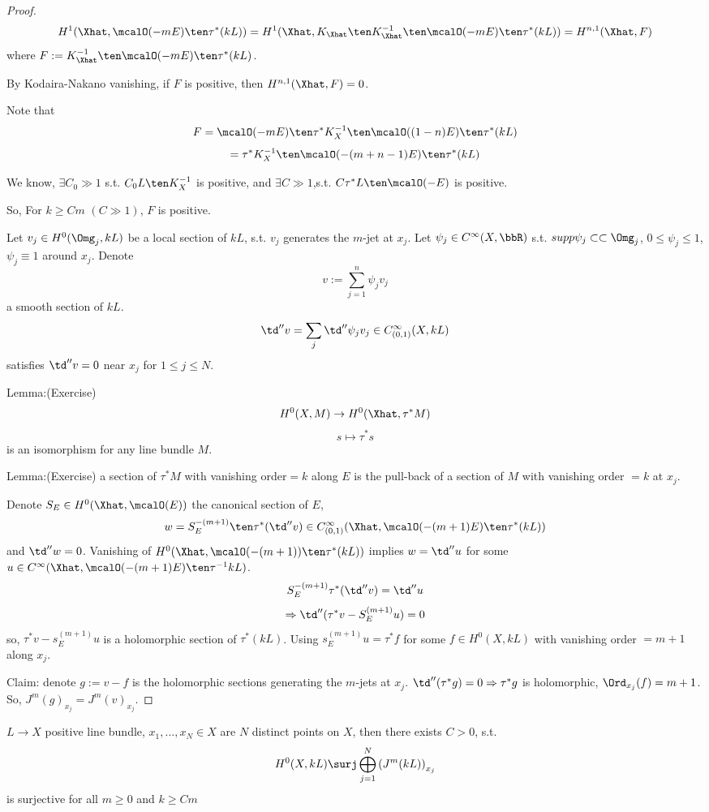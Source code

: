 \begin{proof}
$$
  H^1(\Xhat,\mcalO(-mE)\ten\tau^*(kL))
=
  H^1(\Xhat,K_{\Xhat}\ten K^{-1}_{\Xhat}\ten\mcalO(-mE)\ten\tau^*(kL))
=
  H^{n,1}(\Xhat,F)
$$
where $F:= K^{-1}_{\Xhat}\ten\mcalO(-mE)\ten\tau^*(kL)$.

By Kodaira-Nakano vanishing, if $F$ is positive,
then $H^{n,1}(\Xhat,F)=0$.

Note that 
$$F=\mcalO(-mE)\ten\tau^*K_X^{-1}\ten\mcalO((1-n)E)\ten\tau^*(kL)$$
$$=\tau^*K_X^{-1}\ten\mcalO(-(m+n-1)E)\ten\tau^*(kL)$$

We know, $\exists C_0\gg 1$ s.t. $C_0L\ten K_X^{-1}$ is positive,
and $\exists C\gg 1$,s.t. $C\tau^*L\ten\mcalO(-E)$ is positive.

So, For $k\geq Cm\,\,(C\gg 1)$, $F$ is positive.

Let $v_j\in H^0(\Omg_j,kL)$ be a local section of $kL$,
s.t. $v_j$ generates the $m$-jet at $x_j$. Let
$\psi_j\in C^\infty(X,\bbR)$ s.t. $supp\psi_j\subset\subset\Omg_j$,
$0\leq\psi_j\leq 1$, $\psi_j\equiv 1$ around $x_j$. Denote
$$
  v:=\sum_{j=1}^{n}
    \psi_jv_j
$$
a smooth section of $kL$.
$$
  \td''v=\sum_{j}\td''\psi_jv_j\in C_{(0,1)}^{\infty}(X,kL)
$$
satisfies $\td''v=0$ near $x_j$ for $1\leq j\leq N$.

Lemma:(Exercise)
$$H^0(X,M)\to H^0(\Xhat,\tau^*M)$$
$$s\mapsto\tau^*s$$
is an isomorphism for any line bundle $M$.

Lemma:(Exercise)
a section of $\tau^*M$ with vanishing order$=k$ along $E$ is the
pull-back of a section of $M$ with vanishing order $=k$ at $x_j$.
\vs 

Denote $S_E\in H^0(\Xhat,\mcalO(E))$ the canonical section of $E$,
$$
  w=S_E^{-(m+1)}\ten\tau^*(\td''v)\in
  C_{(0,1)}^{\infty}
  (\Xhat,\mcalO(-(m+1)E)\ten\tau^*(kL))
$$
and $\td''w=0$. Vanishing of $H^0(\Xhat,\mcalO(-(m+1))\ten\tau^*(kL))$
implies $w=\td'' u$ for some $u\in C^\infty(\Xhat,\mcalO(-(m+1)E)\ten\tau^{-1}kL)$.
$$S_E^{-(m+1)}\tau^*(\td''v)=\td''u$$
$$\Rightarrow\td''(\tau^*v-S_E^{(m+1)}u)=0$$
so, $\tau^*v-s_E^{(m+1)}u$ is a holomorphic section of $\tau^*(kL)$.
Using $s_E^{(m+1)}u=\tau^*f$ for some $f\in H^0(X,kL)$ with vanishing order
$= m+1$ along $x_j$.

Claim: denote $g:= v-f$ is the holomorphic sections generating 
the $m$-jets at $x_j$. $\td''(\tau^*g)=0\Rightarrow\tau^*g$ is holomorphic,
$\Ord_{x_j}(f)=m+1$. So, $J^m(g)_{x_j}=J^m(v)_{x_j}$. 

\end{proof}

\begin{thm} $L\to X$ positive line bundle, $x_1,...,x_N\in X$
are $N$ distinct points on $X$, then there exists $C>0$, s.t.
$$
  H^0(X,kL)\surj\bigoplus_{j=1}^N
  \left(
    J^m(kL)
  \right)_{x_j}
$$ 
is surjective for all $m\geq 0$ and $k\geq Cm$
\end{thm}

